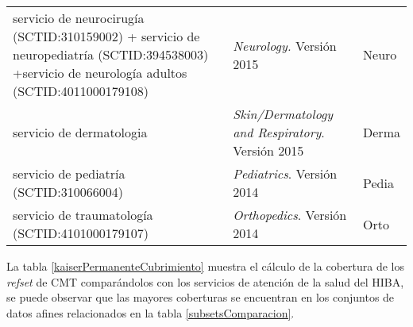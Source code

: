 \begin{table}[htb]
\begin{tabularx}{\textwidth}{@{}XXl@{}}
servicio de neurocirugía \newline (SCTID:310159002)  + \newline servicio de neuropediatría \newline (SCTID:394538003) +\newline  servicio de neurología adultos   \newline (SCTID:4011000179108)                                  & \textit{Neurology.} Versión 2015                & Neuro          \\
servicio de dermatologia                                                                                                   & \textit{Skin/Dermatology and Respiratory}. Versión 2015  &Derma  \\
servicio de pediatría   \newline (SCTID:310066004)                                                                                                        & \textit{Pediatrics}. Versión 2014                     & Pedia    \\
servicio de traumatología  \newline (SCTID:4101000179107)                                                                                                   & \textit{Orthopedics}. Versión 2014                      & Orto  \\ \bottomrule
\end{tabularx}
\end{table}


La tabla \ref{kaiserPermanenteCubrimiento} muestra el cálculo de la cobertura de los \textit{\acrshort{refset}} de \acrshort{CMT} comparándolos con los servicios de atención de la salud del \acrshort{HIBA}, se puede observar que las mayores coberturas se encuentran en los conjuntos de datos afines relacionados en la tabla \ref{subsetsComparacion}.

